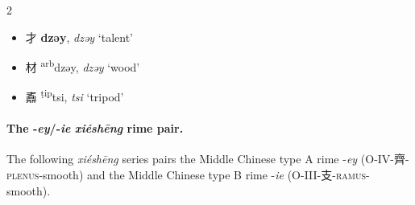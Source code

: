 \begin{multicols}{2}
\medskip

\begin{itemize}

    \item {\Large{才}} %
    {\large{\textbf{dzəy}}},
    \textit{dzəy} %
    `talent'

    \item {\Large{材}} %
    {\large{{\textsuperscript{arb}dzəy}}},
    \textit{dzəy} %
    `wood'

    \item {\Large{鼒}} %
    {\large{{\textsuperscript{ṭip}tsi}}},
    \textit{tsi} %
    `tripod'

\end{itemize}
\end{multicols}







\paragraph{The -\textit{ey}/-\textit{ie} \textit{xiéshēng} rime pair.}
\label{par:ey-ie-XS-pair}
The following \textit{xiéshēng} series pairs the Middle Chinese type A rime -\textit{ey} (O-IV-齊-\textsc{plenus}-smooth) and the Middle Chinese type B rime -\textit{ie} (O-III-支-\textsc{ramus}-smooth).



